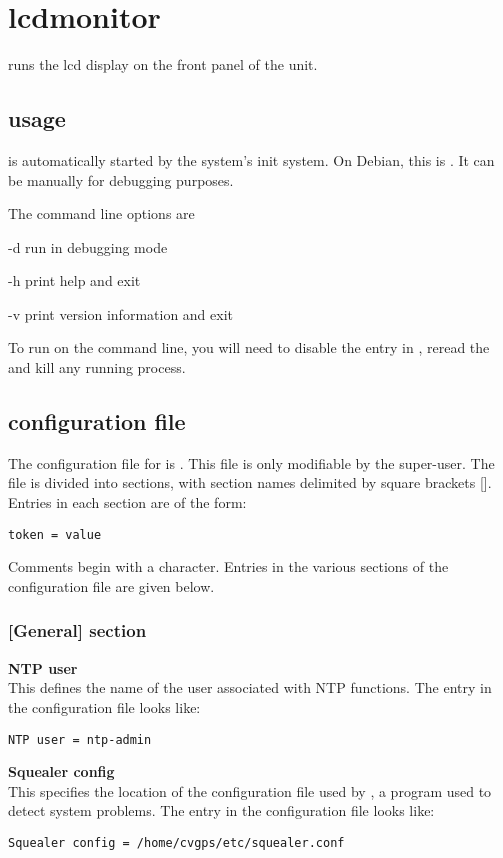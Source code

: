 \section{lcdmonitor \label{slcdmonitor}}

 runs the lcd display on the front panel of the  unit.

\subsection{usage}
 is automatically started by the system's init system.
On Debian, this is . It can be manually for debugging purposes.

The command line options are
\begin{description*}
	\item[-d]	run in debugging mode
	\item[-h]	print help and exit
	\item[-v]	print version information and exit
\end{description*}
To run  on the command line, you will need to disable the entry in ,
reread the  and kill any running  process.

\subsection{configuration file}

The configuration file for  is . This file is
only modifiable by the super-user. The file is divided into
sections, with section names delimited by square brackets [\space]. Entries in each section
are of the form:
\begin{lstlisting}
token = value
\end{lstlisting}
Comments begin with a \cc{\#} character. Entries in the various sections of the configuration file
are given below. 

\subsubsection{[General] section}

{\bfseries NTP user}\\
This  defines the name of the user associated with NTP functions.
The entry in the configuration file looks like:
\begin{lstlisting}
NTP user = ntp-admin
\end{lstlisting}
{\bfseries Squealer config}\\
This  specifies the location of the configuration file used by , a
program used to detect system problems.
The entry in the configuration file looks like:
\begin{lstlisting}
Squealer config = /home/cvgps/etc/squealer.conf
\end{lstlisting}

